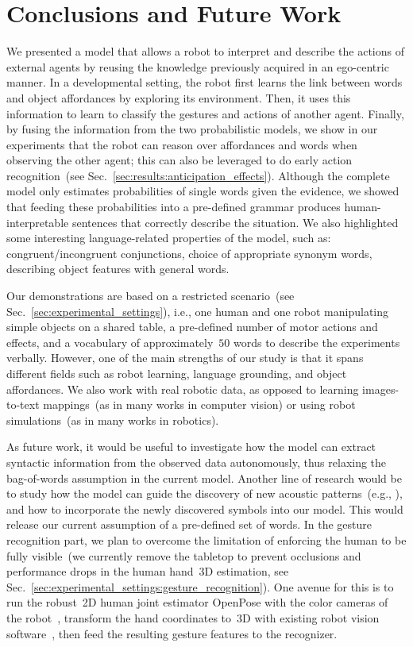 
\section{Conclusions and Future Work}
\label{sec:conclusions}

We presented a model that allows a robot to interpret and describe the actions of external agents by reusing the knowledge previously acquired in an ego-centric manner.
In a developmental setting, the robot first learns the link between words and object affordances by exploring its environment.
Then, it uses this information to learn to classify the gestures and actions of another agent.
Finally, by fusing the information from the two probabilistic models, we show in our experiments that the robot can reason over affordances and words when observing the other agent; this can also be leveraged to do early action recognition~(see Sec.~\ref{sec:results:anticipation_effects}).
Although the complete model only estimates probabilities of single words given the evidence, we showed that feeding these probabilities into a pre-defined grammar produces human-interpretable sentences that correctly describe the situation.
We also highlighted some interesting language-related properties of the model, such as:
congruent/incongruent conjunctions,
choice of appropriate synonym words,
describing object features with general words.

Our demonstrations are based on a restricted scenario~(see Sec.~\ref{sec:experimental_settings}), i.e., one human and one robot manipulating simple objects on a shared table, a pre-defined number of motor actions and effects, and a vocabulary of approximately~$50$ words to describe the experiments verbally.
However, one of the main strengths of our study is that it spans different fields such as robot learning, language grounding, and object affordances.
We also work with real robotic data, as opposed to learning images-to-text mappings~(as in many works in computer vision) or using robot simulations~(as in many works in robotics).

As future work, it would be useful to investigate how the model can extract syntactic information from the observed data autonomously, thus relaxing the bag-of-words assumption in the current model.
Another line of research would be to study how the model can guide the discovery of new acoustic patterns~(e.g., \cite{falstrom:2017:glu, vanhainen2014:icassp, vanhainen:2012:interspeech}), and how to incorporate the newly discovered symbols into our \AffWords{} model.
This would release our current assumption of a pre-defined set of words.
In the gesture recognition part, we plan to overcome the limitation of enforcing the human to be fully visible~(we currently remove the tabletop to prevent occlusions and performance drops in the human hand~3D estimation, see Sec.~\ref{sec:experimental_settings:gesture_recognition}).
One avenue for this is to run the robust~2D human joint estimator OpenPose with the color cameras of the robot~\cite{cao:2017:openpose-cpvr}, transform the hand coordinates to~3D with existing robot vision software~\cite{roncone:2016:rss}, then feed the resulting gesture features to the recognizer.
